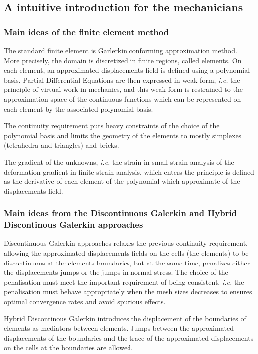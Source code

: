 \subsection{A intuitive introduction for the mechanicians}
\label{introduction}

\subsubsection{Main ideas of the finite element method}

The standard finite element is Garlerkin conforming approximation
method. More precisely, the domain is discretized in finite regions,
called elements. On each element, an approximated displacements field is
defined using a polynomial basis. Partial Differential Equations are
then expressed in weak form, \textit{i.e.} the principle of virtual work in
mechanics, and this weak form is restrained to the approximation space
of the continuous functions which can be represented on each element by
the associated polynomial basis.

The continuity requirement puts heavy constraints of the choice of the
polynomial basis and limits the geometry of the elements to mostly
simplexes (tetrahedra and triangles) and bricks.

The gradient of the unknowns, \textit{i.e.} the strain in small strain analysis
of the deformation gradient in finite strain analysis, which enters the
principle is defined as the derivative of each element of the polynomial
which approximate of the displacements field.

\subsubsection{Main ideas from the Discontinuous Galerkin and Hybrid Discontinous Galerkin approaches}

Discontinuous Galerkin approaches relaxes the previous continuity
requirement, allowing the approximated displacements fields on the cells
(the elements) to be discontinuous at the elements boundaries, but at
the same time, penalizes either the displacements jumps or the jumps in
normal stress. The choice of the penalisation must meet the important
requirement of being consistent, \textit{i.e.} the penalisation must behave
appropriately when the mesh sizes decreases to ensures optimal
convergence rates and avoid spurious effects.

Hybrid Discontinous Galerkin introduces the displacement of the
boundaries of elements as mediators between elements. Jumps between the
approximated displacements of the boundaries and the trace of the
approximated displacements on the cells at the boundaries are allowed.

